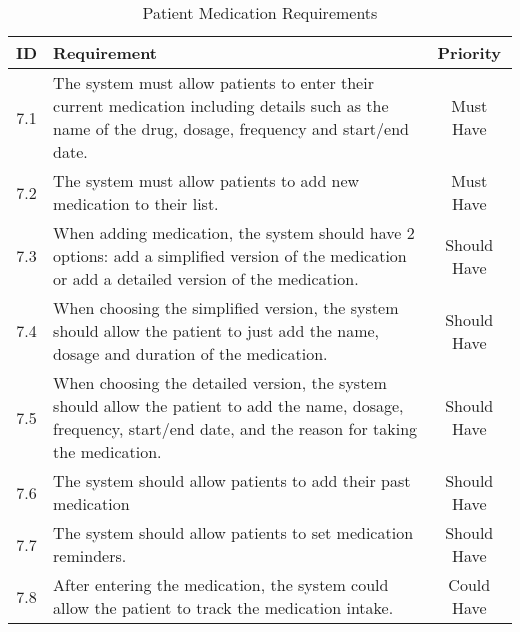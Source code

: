 \begin{table}[h!]
    \centering
    \begin{tabular}{|c|p{10cm}|c|}
    \hline
    \textbf{ID}  & \textbf{Requirement}  & \textbf{Priority} \\ \hline
    7.1  & The system must allow patients to enter their current medication including details such as the name of the drug, dosage, frequency and start/end date. & Must Have \\ \hline
    7.2 & The system must allow patients to add new medication to their list. & Must Have \\ \hline
    7.3 & When adding medication, the system should have 2 options: add a simplified version of the medication or add a detailed version of the medication. & Should Have \\ \hline
    7.4 & When choosing the simplified version, the system should allow the patient to just add the name, dosage and duration of the medication. & Should Have \\ \hline
    7.5 & When choosing the detailed version, the system should allow the patient to add the name, dosage, frequency, start/end date, and the reason for taking the medication. & Should Have \\ \hline
    7.6  & The system should allow patients to add their past medication & Should Have \\ \hline
    7.7  & The system should allow patients to set medication reminders. & Should Have \\ \hline
    7.8 & After entering the medication, the system could allow the patient to track the medication intake. & Could Have \\ \hline

    \end{tabular}
    \caption{Patient Medication Requirements}
\end{table}
